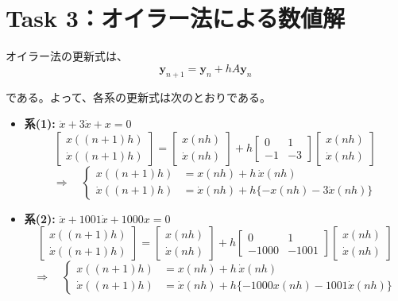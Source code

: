 \documentclass[11pt,a4paper]{jlreq}
\begin{document}
\section*{Task 3：オイラー法による数値解}

オイラー法の更新式は、
\[
\mathbf{y}_{n+1}=\mathbf{y}_n+hA\mathbf{y}_n
\]

である。よって、各系の更新式は次のとおりである。

\begin{itemize}
\item[(i)] \textbf{系(1):} \boldmath$\ddot{x}+3\dot{x}+x=0$\unboldmath
\[
\begin{bmatrix}x((n+1)h)\\ \dot{x}((n+1)h)\end{bmatrix}
=
\begin{bmatrix}x(nh)\\ \dot{x}(nh)\end{bmatrix}
+
h
\begin{bmatrix}0&1\\-1&-3\end{bmatrix}
\begin{bmatrix}x(nh)\\ \dot{x}(nh)\end{bmatrix}
\]
\[
\Longrightarrow\quad
\left\{
\begin{aligned}
x((n+1)h)&=x(nh)+h\,\dot{x}(nh)\\
\dot{x}((n+1)h)&=\dot{x}(nh)+h\{-x(nh)-3\dot{x}(nh)\}
\end{aligned}
\right.
\]
\item[(ii)] \textbf{系(2):} \boldmath$\ddot{x}+1001\dot{x}+1000x=0$\unboldmath
\[
\begin{bmatrix}x((n+1)h)\\ \dot{x}((n+1)h)\end{bmatrix}
=
\begin{bmatrix}x(nh)\\ \dot{x}(nh)\end{bmatrix}
+
h
\begin{bmatrix}0&1\\-1000&-1001\end{bmatrix}
\begin{bmatrix}x(nh)\\ \dot{x}(nh)\end{bmatrix}
\]
\[
\Longrightarrow\quad
\left\{
\begin{aligned}
x((n+1)h)&=x(nh)+h\,\dot{x}(nh)\\
\dot{x}((n+1)h)&=\dot{x}(nh)+h\{-1000x(nh)-1001\dot{x}(nh)\}
\end{aligned}
\right.
\]
\end{itemize}
\end{document}
